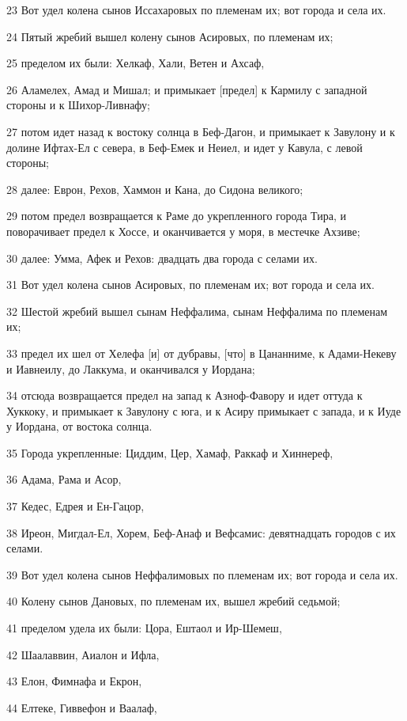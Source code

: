 \par 23 Вот удел колена сынов Иссахаровых по племенам их; вот города и села их.
\par 24 Пятый жребий вышел колену сынов Асировых, по племенам их;
\par 25 пределом их были: Хелкаф, Хали, Ветен и Ахсаф,
\par 26 Аламелех, Амад и Мишал; и примыкает [предел] к Кармилу с западной стороны и к Шихор-Ливнафу;
\par 27 потом идет назад к востоку солнца в Беф-Дагон, и примыкает к Завулону и к долине Ифтах-Ел с севера, в Беф-Емек и Неиел, и идет у Кавула, с левой стороны;
\par 28 далее: Еврон, Рехов, Хаммон и Кана, до Сидона великого;
\par 29 потом предел возвращается к Раме до укрепленного города Тира, и поворачивает предел к Хоссе, и оканчивается у моря, в местечке Ахзиве;
\par 30 далее: Умма, Афек и Рехов: двадцать два города с селами их.
\par 31 Вот удел колена сынов Асировых, по племенам их; вот города и села их.
\par 32 Шестой жребий вышел сынам Неффалима, сынам Неффалима по племенам их;
\par 33 предел их шел от Хелефа [и] от дубравы, [что] в Цананниме, к Адами-Некеву и Иавнеилу, до Лаккума, и оканчивался у Иордана;
\par 34 отсюда возвращается предел на запад к Азноф-Фавору и идет оттуда к Хуккоку, и примыкает к Завулону с юга, и к Асиру примыкает с запада, и к Иуде у Иордана, от востока солнца.
\par 35 Города укрепленные: Циддим, Цер, Хамаф, Раккаф и Хиннереф,
\par 36 Адама, Рама и Асор,
\par 37 Кедес, Едрея и Ен-Гацор,
\par 38 Иреон, Мигдал-Ел, Хорем, Беф-Анаф и Вефсамис: девятнадцать городов с их селами.
\par 39 Вот удел колена сынов Неффалимовых по племенам их; вот города и села их.
\par 40 Колену сынов Дановых, по племенам их, вышел жребий седьмой;
\par 41 пределом удела их были: Цора, Ештаол и Ир-Шемеш,
\par 42 Шаалаввин, Аиалон и Ифла,
\par 43 Елон, Фимнафа и Екрон,
\par 44 Елтеке, Гиввефон и Ваалаф,
